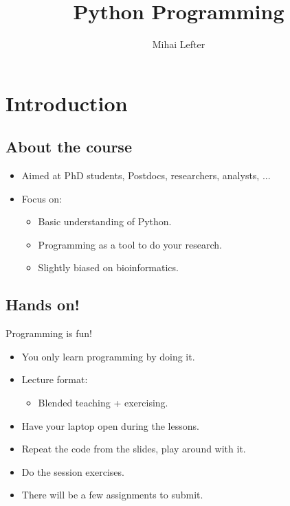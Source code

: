 \documentclass[slidestop]{beamer}
\author{Mihai Lefter}
\title{Python Programming}
\begin{document}


\section{Introduction}
\makeTableOfContents

\subsection{About the course}
\begin{pframe}
 \begin{itemize}
  \item Aimed at PhD students, Postdocs, researchers, analysts, ...
  \item Focus on:
  \begin{itemize}
   \item Basic understanding of Python.
   \item Programming as a tool to do your research.
   \item Slightly biased on bioinformatics.
  \end{itemize}
 \end{itemize}
\end{pframe}

\subsection{Hands on!}
\begin{pframe}
 Programming is fun!
 \begin{itemize}
  \item You only learn programming by doing it.
  \item Lecture format:
  \begin{itemize}
   \item Blended teaching + exercising.
  \end{itemize}
  \item Have your laptop open during the lessons.
  \item Repeat the code from the slides, play around with it.
  \item Do the session exercises.
  \item There will be a few assignments to submit.
 \end{itemize}
\end{pframe}
\end{document}
